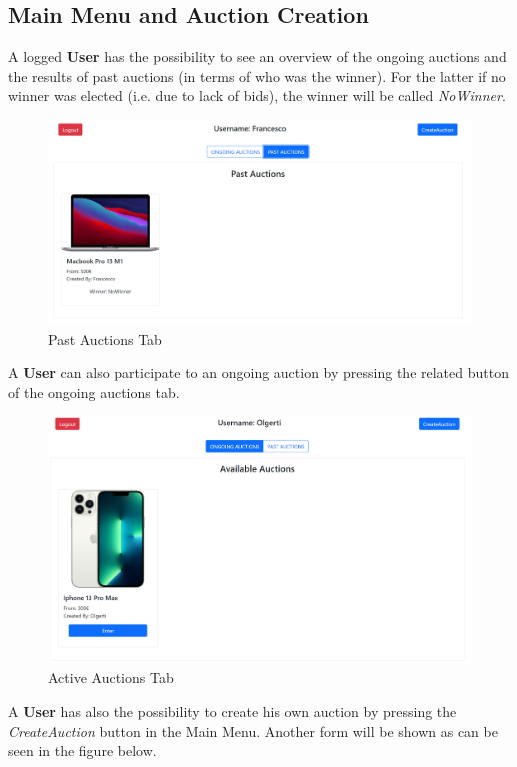 \subsection{Main Menu and Auction Creation}
A logged \textbf{User} has the possibility to see an overview of the ongoing auctions and the results of past auctions (in terms of who was the winner). For the latter if no winner was elected (i.e. due to lack of bids), the winner will be called \textit{NoWinner}.
\begin{figure}[H]
	\centering
	\includegraphics[width=\linewidth]{img/past_auctions}
	\caption{Past Auctions Tab}
	\label{fig:pastauctions}
\end{figure}

A \textbf{User} can also participate to an ongoing auction by pressing the related button of the ongoing auctions tab. 

\begin{figure}[H]
	\centering
	\includegraphics[width=1\linewidth]{img/active_auctions}
	\caption{Active Auctions Tab}
	\label{fig:activeauctions}
\end{figure}


A \textbf{User} has also the possibility to create his own auction by pressing the \textit{CreateAuction} button in the Main Menu. Another form will be shown as can be seen in the figure below.

